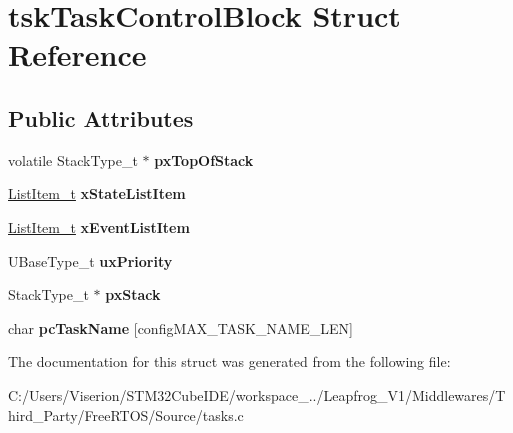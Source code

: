 \hypertarget{structtsk_task_control_block}{}\section{tsk\+Task\+Control\+Block Struct Reference}
\label{structtsk_task_control_block}
\subsection*{Public Attributes}
\begin{DoxyCompactItemize}
\item 
\mbox{\label{structtsk_task_control_block_a429a186c7f8e34aba1eef5e12d215b90}} 
volatile Stack\+Type\+\_\+t $\ast$ {\bfseries px\+Top\+Of\+Stack}
\item 
\mbox{\label{structtsk_task_control_block_a16e0d20425d53ac78537e1fdb8834cf6}} 
\mbox{\hyperlink{structx_l_i_s_t___i_t_e_m}{List\+Item\+\_\+t}} {\bfseries x\+State\+List\+Item}
\item 
\mbox{\label{structtsk_task_control_block_a1a1612b6081a13683808284d93a9b28f}} 
\mbox{\hyperlink{structx_l_i_s_t___i_t_e_m}{List\+Item\+\_\+t}} {\bfseries x\+Event\+List\+Item}
\item 
\mbox{\label{structtsk_task_control_block_a79187811e3d2a15595942e3b44237d85}} 
U\+Base\+Type\+\_\+t {\bfseries ux\+Priority}
\item 
\mbox{\label{structtsk_task_control_block_a9a0d71a9f95dd0609f9911d9efd79134}} 
Stack\+Type\+\_\+t $\ast$ {\bfseries px\+Stack}
\item 
\mbox{\label{structtsk_task_control_block_a67d61291794f38afb5be5132078bc24f}} 
char {\bfseries pc\+Task\+Name} \mbox{[}config\+M\+A\+X\+\_\+\+T\+A\+S\+K\+\_\+\+N\+A\+M\+E\+\_\+\+L\+EN\mbox{]}
\end{DoxyCompactItemize}


The documentation for this struct was generated from the following file\+:\begin{DoxyCompactItemize}
\item 
C\+:/\+Users/\+Viserion/\+S\+T\+M32\+Cube\+I\+D\+E/workspace\+\_../\+Leapfrog\+\_\+\+V1/\+Middlewares/\+Third\+\_\+\+Party/\+Free\+R\+T\+O\+S/\+Source/tasks.\+c\end{DoxyCompactItemize}

